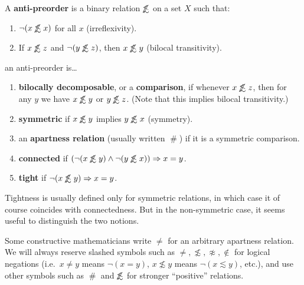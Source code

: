 \documentclass{article}
\def\apart{\mathrel{\#}}
\def\napprox{\not\approx}
\def\oapt{\mathrel{\!\not\,\not\lesssim}}
\def\leapx{\lesssim}
\let\implies\Rightarrow
\begin{document}
\begin{defn}\label{def:anti-preorder}
  A \textbf{anti-preorder} is a binary relation $\oapt$ on a set $X$ such that:
  \begin{enumerate}
  \item $\neg(x\oapt x)$ for all $x$ (irreflexivity).
  \item If $x\oapt z$ and $\neg(y\oapt z)$, then $x\oapt y$ (bilocal transitivity).
  \end{enumerate}
  an anti-preorder is\dots
  \begin{enumerate}[resume]
  \item \textbf{bilocally decomposable}, or a \textbf{comparison}, if whenever $x\oapt z$, then for any $y$ we have $x\oapt y$ or $y\oapt z$.
    (Note that this implies bilocal transitivity.)
  \item \textbf{symmetric} if $x\oapt y$ implies $y\oapt x$ (symmetry).
  \item an \textbf{apartness relation} (usually written $\apart$) if it is a symmetric comparison.
  \item \textbf{connected} if $(\neg(x\oapt y)\land \neg(y\oapt x))\implies x=y$.
  \item \textbf{tight} if $\neg(x\oapt y) \implies x=y$.
  \end{enumerate}
\end{defn}

Tightness is usually defined only for symmetric relations, in which case it of course coincides with connectedness.
But in the non-symmetric case, it seems useful to distinguish the two notions.

\begin{warn}
  Some constructive mathematicians write $\neq$ for an arbitrary apartness relation.
  We will always reserve slashed symbols such as $\neq,\not\leapx,\napprox,\notin$ for logical negations (i.e.\ $x\neq y$ means $\neg(x=y)$, $x\not\leapx y$ means $\neg(x\leapx y)$, etc.), and use other symbols such as $\apart$ and $\oapt$ for stronger ``positive'' relations.
\end{warn}
\end{document}
